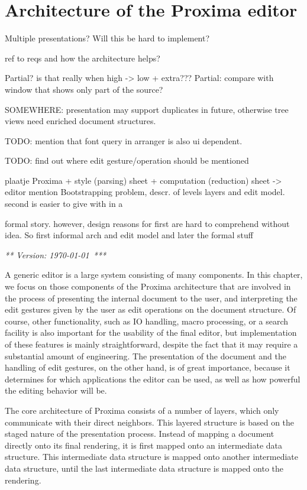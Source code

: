 \chapter{Architecture of the Proxima editor}
\label{chap:proxArch}

\bc
Multiple presentations? Will this be hard to implement?

ref to reqs and how the architecture helps?

Partial? is that really when high -> low + extra???
Partial: compare with window that shows only part of the source?

SOMEWHERE: presentation may support duplicates in future, otherwise tree views need enriched 
 document structures.

TODO: mention that font query in arranger is also ui dependent.

TODO: find out where edit gesture/operation should be mentioned

plaatje Proxima + style (parsing) sheet + computation (reduction) sheet -> editor mention Bootstrapping problem, descr. of levels layers and edit model. second is easier to give with in a

formal story. however, design reasons for first are hard to comprehend without idea. So first informal arch 
 and edit model and later the formal stuff
\ec


{\em *** Version: \today~***}


A generic editor is a large system consisting of many components. In this chapter, we focus on those components of the Proxima architecture that are involved in the process of presenting the internal document to the user, and interpreting the edit gestures given by the user as edit operations on the document structure. Of course, other functionality, such as IO handling, macro processing, or a search facility is also important for the usability of the final editor, but implementation of these features is mainly straightforward, despite the fact that it may require a substantial amount of engineering. The presentation of the document and the handling of edit gestures, on the other hand, is of great importance, because it determines for which applications the editor can be used, as well as how powerful the editing behavior will be.

The core architecture of Proxima consists of a number of layers, which only communicate with their direct neighbors. This layered structure is based on the staged nature of the presentation process. Instead of mapping a document directly onto its final rendering, it is first mapped onto an intermediate data structure. This intermediate data structure is mapped onto another intermediate data structure, until the last intermediate data structure is mapped onto the rendering. 

